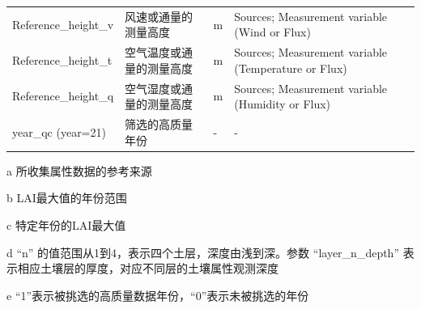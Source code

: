 \begin{table}[htbp]
\begin{threeparttable}
\begin{tabular}{p{9.75em}p{10.25em}p{3.5em}p{9.5em}}
      Reference\_height\_v                                 & 风速或通量的测量高度      & m              & Sources; Measurement variable (Wind or Flux)                 \\
      Reference\_height\_t                                 & 空气温度或通量的测量高度  & m              & Sources; Measurement variable (Temperature or Flux)          \\
      Reference\_height\_q                                 & 空气湿度或通量的测量高度  & m              & Sources; Measurement variable (Humidity or Flux)             \\
      year\_qc (year=21)                                   & 筛选的高质量年份\tnote{e} & -              & -                                                            \\
      \bottomrule
    \end{tabular}
    \begin{tablenotes}
    \item [a] 所收集属性数据的参考来源
    \item [b] LAI最大值的年份范围
    \item [c] 特定年份的LAI最大值
    \item [d] ``n'' 的值范围从1到4，表示四个土层，深度由浅到深。参数
      ``layer\_n\_depth'' 表示相应土壤层的厚度，对应不同层的土壤属性观测深度
    \item [e] ``1''表示被挑选的高质量数据年份，``0''表示未被挑选的年份
    \end{tablenotes}
  \end{threeparttable}
\end{table}

